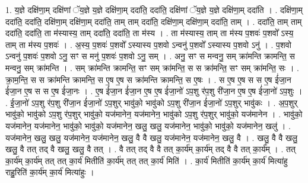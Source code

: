 \documentclass[17pt]{extarticle}
\begin{document}
1. य॒ज्ञे दक्षि॑णा॒म् दक्षि॑णां ॅय॒ज्ञे य॒ज्ञे दक्षि॑णा॒म् ददा॑ति॒ ददा॑ति॒ दक्षि॑णां ॅय॒ज्ञे य॒ज्ञे दक्षि॑णा॒म् ददा॑ति । . दक्षि॑णा॒म् ददा॑ति॒ ददा॑ति॒ दक्षि॑णा॒म् दक्षि॑णा॒म् ददा॑ति॒ ताम् ताम् ददा॑ति॒ दक्षि॑णा॒म् दक्षि॑णा॒म् ददा॑ति॒ ताम् । . ददा॑ति॒ ताम् ताम् ददा॑ति॒ ददा॑ति॒ ता म॑स्यास्य॒ ताम् ददा॑ति॒ ददा॑ति॒ ता म॑स्य । . ता म॑स्यास्य॒ ताम् ता म॑स्य प॒शवः॑ प॒शवो᳚ ऽस्य॒ ताम् ता म॑स्य प॒शवः॑ । . अ॒स्य॒ प॒शवः॑ प॒शवो᳚ ऽस्यास्य प॒शवो ऽन्वनु॑ प॒शवो᳚ ऽस्यास्य प॒शवो ऽनु॑ । . प॒शवो ऽन्वनु॑ प॒शवः॑ प॒शवो ऽनु॒ सꣳ स मनु॑ प॒शवः॑ प॒शवो ऽनु॒ सम् । . अनु॒ सꣳ स मन्वनु॒ सम् क्रा॑मन्ति क्रामन्ति॒ स मन्वनु॒ सम् क्रा॑मन्ति । . सम् क्रा॑मन्ति क्रामन्ति॒ सꣳ सम् क्रा॑मन्ति॒ स स क्रा॑मन्ति॒ सꣳ सम् क्रा॑मन्ति॒ सः । . क्रा॒म॒न्ति॒ स स क्रा॑मन्ति क्रामन्ति॒ स ए॒ष ए॒ष स क्रा॑मन्ति क्रामन्ति॒ स ए॒षः । . स ए॒ष ए॒ष स स ए॒ष ई॑जा॒न ई॑जा॒न ए॒ष स स ए॒ष ई॑जा॒नः । . ए॒ष ई॑जा॒न ई॑जा॒न ए॒ष ए॒ष ई॑जा॒नो॑ ऽप॒शु र॑प॒शु री॑जा॒न ए॒ष ए॒ष ई॑जा॒नो॑ ऽप॒शुः । . ई॒जा॒नो॑ ऽप॒शु र॑प॒शु री॑जा॒न ई॑जा॒नो॑ ऽप॒शुर् भावु॑को॒ भावु॑को ऽप॒शु री॑जा॒न ई॑जा॒नो॑ ऽप॒शुर् भावु॑कः । . अ॒प॒शुर् भावु॑को॒ भावु॑को ऽप॒शु र॑प॒शुर् भावु॑को॒ यज॑मानेन॒ यज॑मानेन॒ भावु॑को ऽप॒शु र॑प॒शुर् भावु॑को॒ यज॑मानेन । . भावु॑को॒ यज॑मानेन॒ यज॑मानेन॒ भावु॑को॒ भावु॑को॒ यज॑मानेन॒ खलु॒ खलु॒ यज॑मानेन॒ भावु॑को॒ भावु॑को॒ यज॑मानेन॒ खलु॑ । . यज॑मानेन॒ खलु॒ खलु॒ यज॑मानेन॒ यज॑मानेन॒ खलु॒ वै वै खलु॒ यज॑मानेन॒ यज॑मानेन॒ खलु॒ वै । . खलु॒ वै वै खलु॒ खलु॒ वै तत् तद् वै खलु॒ खलु॒ वै तत् । . वै तत् तद् वै वै तत् का॒र्य॑म् का॒र्य॑म् तद् वै वै तत् का॒र्य᳚म् । . तत् का॒र्य॑म् का॒र्य॑म् तत् तत् का॒र्य॑ मितीति॑ का॒र्य॑म् तत् तत् का॒र्य॑ मिति॑ । . का॒र्य॑ मितीति॑ का॒र्य॑म् का॒र्य॑ मित्या॑हु राहु॒रिति॑ का॒र्य॑म् का॒र्य॑ मित्या॑हुः । \newline
\end{document}
